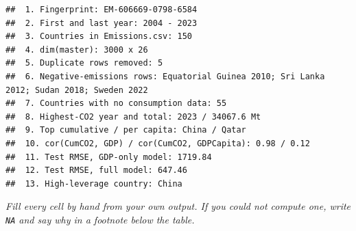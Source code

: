 \documentclass[
]{article}
\newenvironment{Shaded}{\begin{snugshade}}{\end{snugshade}}
\newcommand{\DecValTok}[1]{\textcolor[rgb]{0.00,0.00,0.81}{#1}}
\newcommand{\FunctionTok}[1]{\textcolor[rgb]{0.13,0.29,0.53}{\textbf{#1}}}
\newcommand{\NormalTok}[1]{#1}
\newcommand{\SpecialCharTok}[1]{\textcolor[rgb]{0.81,0.36,0.00}{\textbf{#1}}}
\newcommand{\StringTok}[1]{\textcolor[rgb]{0.31,0.60,0.02}{#1}}
\begin{document}
\begin{Shaded}
\end{Shaded}

\begin{verbatim}
##  1. Fingerprint: EM-606669-0798-6584 
##  2. First and last year: 2004 - 2023 
##  3. Countries in Emissions.csv: 150 
##  4. dim(master): 3000 x 26 
##  5. Duplicate rows removed: 5 
##  6. Negative-emissions rows: Equatorial Guinea 2010; Sri Lanka 2012; Sudan 2018; Sweden 2022 
##  7. Countries with no consumption data: 55 
##  8. Highest-CO2 year and total: 2023 / 34067.6 Mt
##  9. Top cumulative / per capita: China / Qatar 
##  10. cor(CumCO2, GDP) / cor(CumCO2, GDPCapita): 0.98 / 0.12 
##  11. Test RMSE, GDP-only model: 1719.84 
##  12. Test RMSE, full model: 647.46 
##  13. High-leverage country: China
\end{verbatim}

\emph{Fill every cell by hand from your own output. If you could not
compute one, write \texttt{NA} and say why in a footnote below the
table.}
\end{document}

